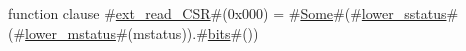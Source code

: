 function clause #\hyperref[sailRISCVzextzyreadzyCSR]{ext\_read\_CSR}#(0x000) = #\hyperref[sailRISCVzSome]{Some}#(#\hyperref[sailRISCVzlowerzysstatus]{lower\_sstatus}#(#\hyperref[sailRISCVzlowerzymstatus]{lower\_mstatus}#(mstatus)).#\hyperref[sailRISCVzbits]{bits}#())
